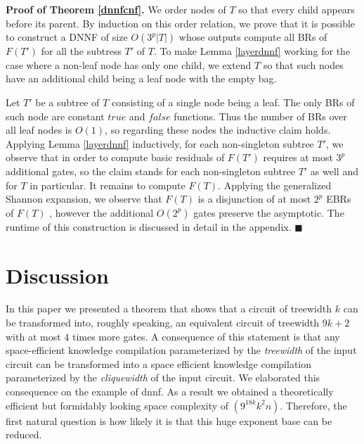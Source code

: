 \documentclass{llncs}
\begin{document}
{\bf Proof of Theorem \ref{dnnfcnf}.}
We order nodes of $T$ so that every child appears before
its parent. By induction on this order relation, we prove that it is possible to construct
a DNNF of size $O(3^p|T|)$ whose outputs compute all BRs of $F(T')$ for all the subtress
$T'$ of $T$. To make Lemma \ref{layerdnnf} working for 
the case where a non-leaf node has only one child, we extend $T$ so that such nodes have 
an additional child being a leaf node with the empty bag.

Let $T'$ be a subtree of $T$ consisting of a single node being a leaf.
The only BRs of such node are constant $true$ and $false$ functions. Thus
the number of BRs over all leaf nodes is $O(1)$, so regarding these nodes the inductive claim
holds. Applying Lemma \ref{layerdnnf} inductively, for each non-singleton subtree $T'$, we observe that
in order to compute basic residuals of $F(T')$ requires at most $3^p$ additional gates, so the claim stands
for each non-singleton subtree $T'$ as well and for $T$ in particular. It remains to compute $F(T)$.
Applying the generalized Shannon expansion, we observe that $F(T)$ is a disjunction of at most $2^p$ EBRs of
$F(T)$ , however the additional $O(2^p)$ gates preserve the asymptotic.  
The runtime of this construction is discussed in detail in the appendix. $\blacksquare$
\section{Discussion}
In this paper we presented a theorem that shows that a circuit of treewidth $k$ can be 
transformed into, roughly speaking, an equivalent circuit of treewidth $9k+2$ with at most $4$ times 
more gates. A consequence of this statement is that any space-efficient knowledge compilation
parameterized by the \emph{treewidth} of the input circuit can be transformed into a space
efficient knowledge compilation parameterized  by the \emph{cliquewidth} of the input circuit.
We elaborated this consequence on the example of {\sc dnnf}. 
As a result we obtained a theoretically efficient but formidably
looking space complexity of $(9^{18k}k^2n)$. Therefore, the first natural question is how likely it is that this huge 
exponent base can be reduced. 
\begin{comment}
We believe there is a lot of room for improvement.
For example, the $9k$ increase of the treewidth bound compared to cliquewidth is the result of double multiplication by $3$,
first by a type respecting clique decomposition and then by associating each label with $3$ gates. We believe that
the type respecting decomposition can be avoided at the price of associating each label with $4$ gates: two {\sc and} ones
and two {\sc or} ones and thus the bound on the treewidth would be $4k$ instead $9k$.
\end{comment}
\end{document}
